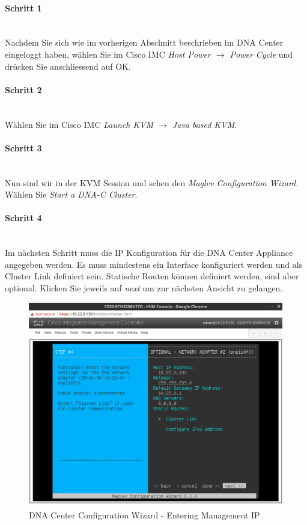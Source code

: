 \paragraph{Schritt 1}
~\\
Nachdem Sie sich wie im vorherigen Abschnitt beschrieben im DNA Center eingeloggt haben, wählen Sie im Cisco IMC \textit{Host Power $\rightarrow$ Power Cycle} und drücken Sie anschliessend auf OK.

\paragraph{Schritt 2}
~\\
Wählen Sie im Cisco IMC \textit{Launch KVM $\rightarrow$ Java based KVM}.

\paragraph{Schritt 3}
~\\
Nun sind wir in der KVM Session und sehen den \textit{Maglev Configuration Wizard}. Wählen Sie \textit{Start a DNA-C Cluster}.

\paragraph{Schritt 4}
~\\
Im nächsten Schritt muss die IP Konfiguration für die DNA Center Appliance angegeben werden. Es muss mindestens ein Interface konfiguriert werden und als Cluster Link definiert sein. Statische Routen können definiert werden, sind aber optional. Klicken Sie jeweils auf \textit{next} um zur nächsten Ansicht zu gelangen.

\begin{figure}[H]
	\centering
	\includegraphics[height=9cm]{img/sc_002.png}
	\caption{DNA Center Configuration Wizard - Entering Management IP}
	\label{fig:installguide-dna-center-install-step-4}
\end{figure} 

